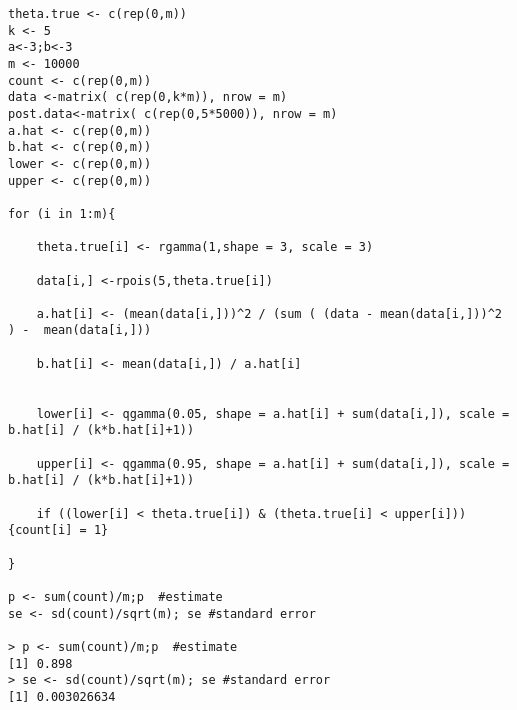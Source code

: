 \documentclass[12pt]{article}
\begin{document}
\begin{flushleft}
\begin{enumerate}
\begin{verbatim}
theta.true <- c(rep(0,m))
k <- 5
a<-3;b<-3
m <- 10000
count <- c(rep(0,m))
data <-matrix( c(rep(0,k*m)), nrow = m)
post.data<-matrix( c(rep(0,5*5000)), nrow = m)
a.hat <- c(rep(0,m))
b.hat <- c(rep(0,m))
lower <- c(rep(0,m))
upper <- c(rep(0,m))

for (i in 1:m){

    theta.true[i] <- rgamma(1,shape = 3, scale = 3)
    
    data[i,] <-rpois(5,theta.true[i])

    a.hat[i] <- (mean(data[i,]))^2 / (sum ( (data - mean(data[i,]))^2 ) -  mean(data[i,]))

    b.hat[i] <- mean(data[i,]) / a.hat[i]


    lower[i] <- qgamma(0.05, shape = a.hat[i] + sum(data[i,]), scale = b.hat[i] / (k*b.hat[i]+1))
    
    upper[i] <- qgamma(0.95, shape = a.hat[i] + sum(data[i,]), scale = b.hat[i] / (k*b.hat[i]+1))

    if ((lower[i] < theta.true[i]) & (theta.true[i] < upper[i])) {count[i] = 1}
    
}

p <- sum(count)/m;p  #estimate
se <- sd(count)/sqrt(m); se #standard error 

> p <- sum(count)/m;p  #estimate
[1] 0.898
> se <- sd(count)/sqrt(m); se #standard error
[1] 0.003026634

\end{verbatim}

\end{enumerate}


\end{flushleft}
\end{document}
